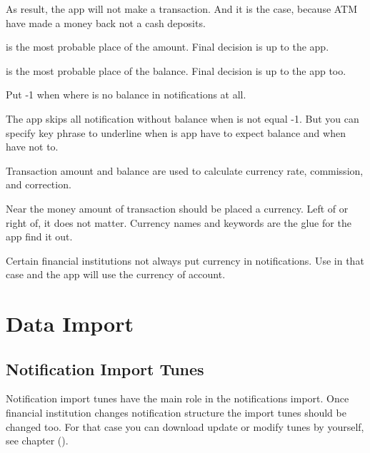 \documentclass[a4paper,10pt,english]{sphinxmanual}
\begin{document}
As result, the app will not make a transaction. And it is the case, because ATM have made a money back not
a cash deposits.

 is the most probable place of the amount. Final
decision is up to the app.

 is the most probable place of the balance. Final
decision is up to the app too.

Put -1 when where is no balance in notifications at all.

The app skips all notification without balance when  is not equal -1.
But you can specify key phrase to underline when is app have to expect balance and when have not to.

Transaction amount and balance are used to calculate currency rate, commission, and correction.

Near the money amount of transaction should be placed a currency. Left of or right of, it does not matter.
Currency names and keywords are the glue for the app find it out.

Certain financial institutions not always put currency in notifications. Use
 in that case and the app will use the currency of account.


\chapter{Data Import}
\label{\detokenize{import:data-import}}\label{\detokenize{import:chapter-import}}\label{\detokenize{import::doc}}

\section{Notification Import Tunes}
\label{\detokenize{import:notification-import-tunes}}
Notification import tunes have the main role in the notifications import. Once
financial institution changes notification structure the import tunes should be changed too.
For that case you can download update or modify tunes by yourself, see chapter {\hyperref[\detokenize{notifications:chapter-notifications}]{}} ().

\noindent{}
\noindent{}
\noindent{}
\end{document}
